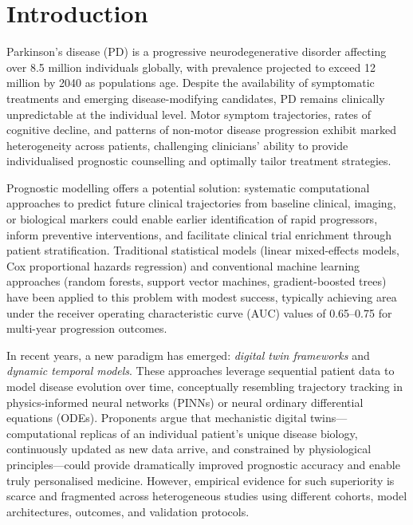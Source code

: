 \section{Introduction}
\label{sr:sec:intro}

Parkinson's disease (PD) is a progressive neurodegenerative disorder affecting over 8.5 million individuals globally, with prevalence projected to exceed 12 million by 2040 as populations age\cite{dorsey2018}. Despite the availability of symptomatic treatments and emerging disease-modifying candidates, PD remains clinically unpredictable at the individual level. Motor symptom trajectories, rates of cognitive decline, and patterns of non-motor disease progression exhibit marked heterogeneity across patients, challenging clinicians' ability to provide individualised prognostic counselling and optimally tailor treatment strategies\cite{kalia2015,tolosa2021}.

Prognostic modelling offers a potential solution: systematic computational approaches to predict future clinical trajectories from baseline clinical, imaging, or biological markers could enable earlier identification of rapid progressors, inform preventive interventions, and facilitate clinical trial enrichment through patient stratification\cite{maetzler2016}. Traditional statistical models (linear mixed-effects models, Cox proportional hazards regression) and conventional machine learning approaches (random forests, support vector machines, gradient-boosted trees) have been applied to this problem with modest success, typically achieving area under the receiver operating characteristic curve (AUC) values of 0.65--0.75 for multi-year progression outcomes\cite{asgari2021}.

In recent years, a new paradigm has emerged: \emph{digital twin frameworks} and \emph{dynamic temporal models}. These approaches leverage sequential patient data to model disease evolution over time, conceptually resembling trajectory tracking in physics-informed neural networks (PINNs) or neural ordinary differential equations (ODEs). Proponents argue that mechanistic digital twins---computational replicas of an individual patient's unique disease biology, continuously updated as new data arrive, and constrained by physiological principles---could provide dramatically improved prognostic accuracy and enable truly personalised medicine\cite{bjornsson2020,laubenbacher2024}. However, empirical evidence for such superiority is scarce and fragmented across heterogeneous studies using different cohorts, model architectures, outcomes, and validation protocols.

